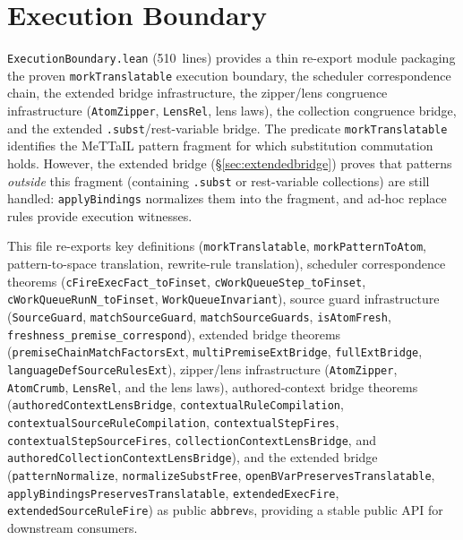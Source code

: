 \documentclass[11pt]{article}
\theoremstyle{definition}
\theoremstyle{remark}
\newcommand{\MeTTaIL}{\textup{MeTTaIL}}
\begin{document}
\section{Execution Boundary}
\label{sec:execboundary}

\texttt{ExecutionBoundary.lean} (510~lines) provides a thin re-export
module packaging the proven \texttt{morkTranslatable} execution boundary,
the scheduler correspondence chain, the extended bridge infrastructure,
the zipper/lens congruence infrastructure (\texttt{AtomZipper},
\texttt{LensRel}, lens laws), the collection congruence bridge, and
the extended \texttt{.subst}/rest-variable bridge.
The predicate \texttt{morkTranslatable} identifies the \MeTTaIL{} pattern
fragment for which substitution commutation holds.  However, the
extended bridge (\S\ref{sec:extendedbridge}) proves that patterns
\emph{outside} this fragment (containing \texttt{.subst} or rest-variable
collections) are still handled: \texttt{applyBindings} normalizes them
into the fragment, and ad-hoc replace rules provide execution witnesses.

This file re-exports key definitions (\texttt{morkTranslatable},
\texttt{morkPatternToAtom}, pattern-to-space translation, rewrite-rule
translation), scheduler correspondence theorems
(\texttt{cFireExecFact\_toFinset}, \texttt{cWorkQueueStep\_toFinset},
\texttt{cWorkQueueRunN\_toFinset}, \texttt{WorkQueueInvariant}),
source guard infrastructure (\texttt{SourceGuard}, \texttt{matchSourceGuard},
\texttt{matchSourceGuards}, \texttt{isAtomFresh},
\texttt{freshness\_premise\_correspond}),
extended bridge theorems (\texttt{premiseChain\-MatchFactorsExt},
\texttt{multiPremiseExtBridge}, \texttt{fullExtBridge},
\texttt{languageDefSourceRulesExt}),
zipper/lens infrastructure (\texttt{AtomZipper}, \texttt{AtomCrumb},
\texttt{LensRel}, and the lens laws), authored-context bridge theorems
(\texttt{authoredContextLensBridge},
\texttt{contextualRuleCompilation},
\texttt{contextualSourceRuleCompilation},
\texttt{contextualStepFires},
\texttt{contextualStepSourceFires},
\texttt{collectionContextLensBridge}, and
\texttt{authoredCollectionContextLensBridge}),
and the extended bridge (\texttt{patternNormalize},
\texttt{normalizeSubstFree},
\texttt{openBVarPreservesTranslatable},
\texttt{applyBindingsPreservesTranslatable},
\texttt{extendedExecFire},
\texttt{extendedSourceRuleFire})
as public \texttt{abbrev}s, providing a stable public API
for downstream consumers.
\end{document}
